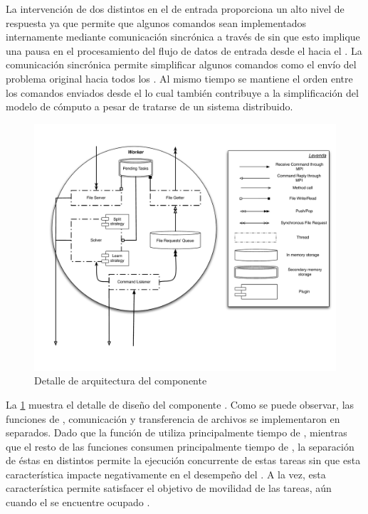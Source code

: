 La intervención de dos \threads distintos en el \datapath de entrada
proporciona un alto nivel de respuesta ya que permite que algunos comandos
sean implementados internamente mediante comunicación sincrónica a través de
\mpi sin que esto implique una pausa en el procesamiento del flujo de datos de
entrada desde el \fend hacia el \bend. La comunicación sincrónica permite
simplificar algunos comandos como el envío del problema original hacia todos
los \ws. Al mismo tiempo se mantiene el orden entre los comandos enviados
desde el \fend lo cual también contribuye a la simplificación del modelo de
cómputo a pesar de tratarse de un sistema distribuido.

\begin{figure}[h!]
\centering
\includegraphics[scale=0.4]{graphs/worker detail}
\caption{Detalle de arquitectura del componente \w}
\label{fig:workerdetail}
\end{figure}

La \fig\ref{fig:workerdetail} muestra el detalle de diseño del componente
\w. Como se puede observar, las funciones de \solving, comunicación y
transferencia de archivos se implementaron en \threads separados. Dado que la
función de \solving utiliza principalmente tiempo de \cpu, mientras que el
resto de las funciones consumen principalmente tiempo de \io, la separación de
éstas en distintos \threads permite la ejecución concurrente de estas
tareas sin que esta característica impacte negativamente en el desempeño del
\ssolver. A la vez, esta característica permite satisfacer el objetivo de
movilidad de las tareas, aún cuando el \w se encuentre ocupado \solveando.

